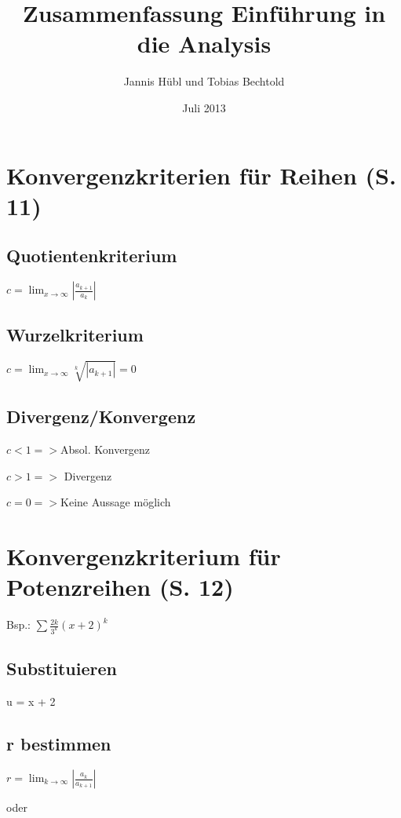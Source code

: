 \documentclass[a4paper, 12pt]{article}
\begin{document}
\title{Zusammenfassung Einführung in die Analysis}
\author{Jannis Hübl und Tobias Bechtold}
\date{Juli 2013}

\maketitle
\newpage
\tableofcontents
\newpage
\section{Konvergenzkriterien für Reihen (S. 11)}

\subsection{Quotientenkriterium}


$ c = \lim_{x \to \infty} |\frac {a_{k+1}} {a_{k}}|$


\subsection{Wurzelkriterium}

$ c = \lim_{x \to \infty} \sqrt[k]{|a_{k+1}|} = 0 $

\subsection{Divergenz/Konvergenz}

$ c < 1 => $Absol. Konvergenz

$ c > 1 => $ Divergenz

$ c = 0 => $Keine Aussage möglich

\section{Konvergenzkriterium für Potenzreihen (S. 12)}

Bsp.: $ \sum \frac{2k}{3^k} (x + 2)^k$

\subsection {Substituieren}
u = x + 2

\subsection {r bestimmen}

$ r = \lim_{k \to \infty} |\frac{a_k}{a_{k+1}}| $

oder
\end{document}
